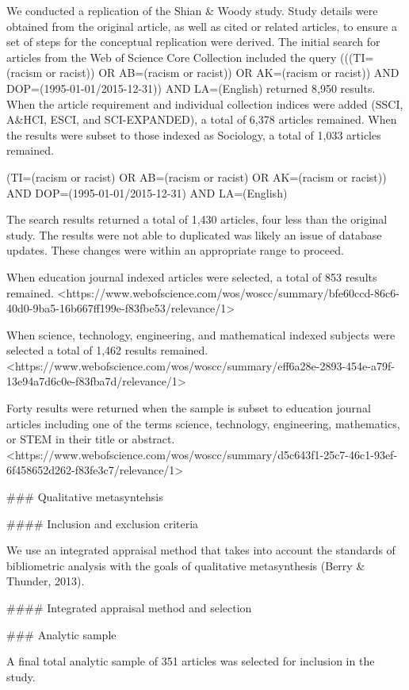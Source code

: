 {{We conducted a replication of the Shian & Woody study. Study details were obtained from the original article, as well as cited or related articles, to ensure a set of  steps for the conceptual replication were derived. The initial search for articles from the Web of Science Core Collection included the query (((TI=(racism or racist)) OR AB=(racism or racist)) OR AK=(racism or racist)) AND DOP=(1995-01-01/2015-12-31)) AND LA=(English) returned 8,950 results. When the article requirement and individual collection indices were added (SSCI, A&HCI, ESCI, and SCI-EXPANDED), a total of 6,378 articles remained. When the results were subset to those indexed as Sociology, a total of 1,033 articles remained.

(TI=(racism or racist) OR AB=(racism or racist) OR AK=(racism or racist)) AND DOP=(1995-01-01/2015-12-31) AND LA=(English)

The search results returned a total of 1,430 articles, four less than the original study. The results were not able to duplicated was likely an issue of database updates. These changes were within an appropriate range to proceed. 

When education journal indexed articles were selected, a total of 853 results remained.
<https://www.webofscience.com/wos/woscc/summary/bfe60ccd-86c6-40d0-9ba5-16b667ff199e-f83fbe53/relevance/1>

When science, technology, engineering, and mathematical indexed subjects were selected a total of 1,462 results remained.
<https://www.webofscience.com/wos/woscc/summary/eff6a28e-2893-454e-a79f-13e94a7d6c0e-f83fba7d/relevance/1>

Forty results were returned when the sample is subset to education journal articles including one of the terms science, technology, engineering, mathematics, or STEM in their title or abstract.
<https://www.webofscience.com/wos/woscc/summary/d5c643f1-25c7-46c1-93ef-6f458652d262-f83fe3c7/relevance/1>

### Qualitative metasyntehsis

#### Inclusion and exclusion criteria

We use an integrated appraisal method that takes into account the standards of bibliometric analysis with the goals of qualitative metasynthesis (Berry & Thunder, 2013).

#### Integrated appraisal method and selection


### Analytic sample

A final total analytic sample of 351 articles was selected for inclusion in the study.

}}
